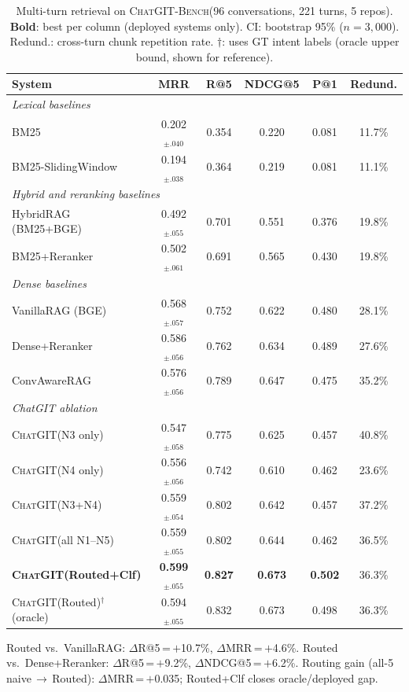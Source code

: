 \documentclass[runningheads]{llncs}
\newcommand{\chatgit}{\textsc{ChatGIT}\xspace}
\newcommand{\conv}{\textsc{ChatGIT-Bench}\xspace}
\begin{document}
\begin{table}[t]
\centering
\caption{Multi-turn retrieval on \conv (96 conversations, 221 turns,
5 repos). \textbf{Bold}: best per column (deployed systems only).
CI: bootstrap 95\% ($n{=}3{,}000$).
Redund.: cross-turn chunk repetition rate.
$\dagger$: uses GT intent labels (oracle upper bound, shown for reference).}
\label{tab:multiturn}
\footnotesize
\begin{tabular}{lccccc}
\toprule
System & MRR & R@5 & NDCG@5 & P@1 & Redund. \\
\midrule
\multicolumn{6}{l}{\textit{Lexical baselines}} \\
\rowcolor{gray!8}
BM25
  & 0.202$_{\pm.040}$ & 0.354 & 0.220 & 0.081 & 11.7\% \\
BM25-SlidingWindow
  & 0.194$_{\pm.038}$ & 0.364 & 0.219 & 0.081 & 11.1\% \\
\multicolumn{6}{l}{\textit{Hybrid and reranking baselines}} \\
HybridRAG (BM25+BGE)
  & 0.492$_{\pm.055}$ & 0.701 & 0.551 & 0.376 & 19.8\% \\
BM25+Reranker
  & 0.502$_{\pm.061}$ & 0.691 & 0.565 & 0.430 & 19.8\% \\
\multicolumn{6}{l}{\textit{Dense baselines}} \\
VanillaRAG (BGE)
  & 0.568$_{\pm.057}$ & 0.752 & 0.622 & 0.480 & 28.1\% \\
Dense+Reranker
  & 0.586$_{\pm.056}$ & 0.762 & 0.634 & 0.489 & 27.6\% \\
ConvAwareRAG
  & 0.576$_{\pm.056}$ & 0.789 & 0.647 & 0.475 & 35.2\% \\
\midrule
\multicolumn{6}{l}{\textit{ChatGIT ablation}} \\
\chatgit (N3 only)
  & 0.547$_{\pm.058}$ & 0.775 & 0.625 & 0.457 & 40.8\% \\
\chatgit (N4 only)
  & 0.556$_{\pm.056}$ & 0.742 & 0.610 & 0.462 & 23.6\% \\
\chatgit (N3+N4)
  & 0.559$_{\pm.054}$ & 0.802 & 0.642 & 0.457 & 37.2\% \\
\chatgit (all N1--N5)
  & 0.559$_{\pm.055}$ & 0.802 & 0.644 & 0.462 & 36.5\% \\
\rowcolor{cIndigo!8}
\textbf{\chatgit (Routed+Clf)}
  & \textbf{0.599}$_{\pm.055}$
  & \textbf{0.827} & \textbf{0.673} & \textbf{0.502}
  & 36.3\% \\
\rowcolor{cIndigo!8}
\chatgit (Routed)$^{\dagger}$ (oracle)
  & 0.594$_{\pm.055}$
  & 0.832 & 0.673 & 0.498
  & 36.3\% \\
\bottomrule
\end{tabular}
\vspace{2pt}
{\footnotesize
Routed vs.\ VanillaRAG: $\Delta$R@5\,=\,$+$10.7\%, $\Delta$MRR\,=\,$+$4.6\%.
Routed vs.\ Dense+Reranker: $\Delta$R@5\,=\,$+$9.2\%, $\Delta$NDCG@5\,=\,$+$6.2\%.
Routing gain (all-5 naive\,$\to$\,Routed): $\Delta$MRR\,=\,$+$0.035; Routed+Clf closes oracle/deployed gap.
}
\end{table}
\end{document}
